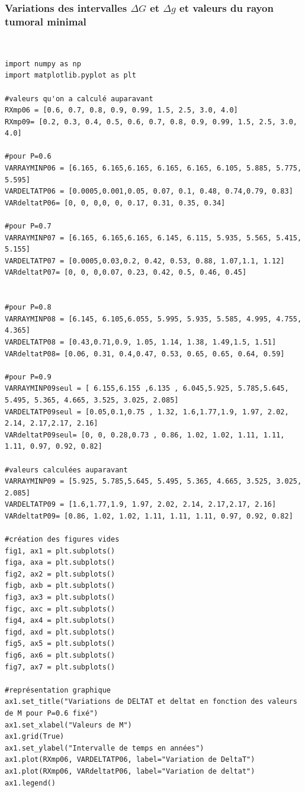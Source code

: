 \documentclass[12pt,a4paper]{article}
\begin{document}
\subsubsection{Variations des intervalles $\Delta G$ et $\Delta g$ et valeurs du rayon tumoral minimal }
\\
\begin{lstlisting}[style=stylepython]
import numpy as np
import matplotlib.pyplot as plt

#valeurs qu'on a calculé auparavant
RXmp06 = [0.6, 0.7, 0.8, 0.9, 0.99, 1.5, 2.5, 3.0, 4.0]
RXmp09= [0.2, 0.3, 0.4, 0.5, 0.6, 0.7, 0.8, 0.9, 0.99, 1.5, 2.5, 3.0, 4.0]

#pour P=0.6
VARRAYMINP06 = [6.165, 6.165,6.165, 6.165, 6.165, 6.105, 5.885, 5.775, 5.595]
VARDELTATP06 = [0.0005,0.001,0.05, 0.07, 0.1, 0.48, 0.74,0.79, 0.83]
VARdeltatP06= [0, 0, 0,0, 0, 0.17, 0.31, 0.35, 0.34]

#pour P=0.7
VARRAYMINP07 = [6.165, 6.165,6.165, 6.145, 6.115, 5.935, 5.565, 5.415, 5.155]
VARDELTATP07 = [0.0005,0.03,0.2, 0.42, 0.53, 0.88, 1.07,1.1, 1.12]
VARdeltatP07= [0, 0, 0,0.07, 0.23, 0.42, 0.5, 0.46, 0.45]


#pour P=0.8
VARRAYMINP08 = [6.145, 6.105,6.055, 5.995, 5.935, 5.585, 4.995, 4.755, 4.365]
VARDELTATP08 = [0.43,0.71,0.9, 1.05, 1.14, 1.38, 1.49,1.5, 1.51]
VARdeltatP08= [0.06, 0.31, 0.4,0.47, 0.53, 0.65, 0.65, 0.64, 0.59]

#pour P=0.9
VARRAYMINP09seul = [ 6.155,6.155 ,6.135 , 6.045,5.925, 5.785,5.645, 5.495, 5.365, 4.665, 3.525, 3.025, 2.085]
VARDELTATP09seul = [0.05,0.1,0.75 , 1.32, 1.6,1.77,1.9, 1.97, 2.02, 2.14, 2.17,2.17, 2.16]
VARdeltatP09seul= [0, 0, 0.28,0.73 , 0.86, 1.02, 1.02, 1.11, 1.11, 1.11, 0.97, 0.92, 0.82]

#valeurs calculées auparavant
VARRAYMINP09 = [5.925, 5.785,5.645, 5.495, 5.365, 4.665, 3.525, 3.025, 2.085]
VARDELTATP09 = [1.6,1.77,1.9, 1.97, 2.02, 2.14, 2.17,2.17, 2.16]
VARdeltatP09= [0.86, 1.02, 1.02, 1.11, 1.11, 1.11, 0.97, 0.92, 0.82]

#création des figures vides 
fig1, ax1 = plt.subplots()
figa, axa = plt.subplots()
fig2, ax2 = plt.subplots()
figb, axb = plt.subplots()
fig3, ax3 = plt.subplots()
figc, axc = plt.subplots()
fig4, ax4 = plt.subplots()
figd, axd = plt.subplots()
fig5, ax5 = plt.subplots()
fig6, ax6 = plt.subplots()
fig7, ax7 = plt.subplots()

#représentation graphique
ax1.set_title("Variations de DELTAT et deltat en fonction des valeurs de M pour P=0.6 fixé")
ax1.set_xlabel("Valeurs de M")
ax1.grid(True)
ax1.set_ylabel("Intervalle de temps en années")
ax1.plot(RXmp06, VARDELTATP06, label="Variation de DeltaT")
ax1.plot(RXmp06, VARdeltatP06, label="Variation de deltat")
ax1.legend()


\end{lstlisting}
\end{document}
